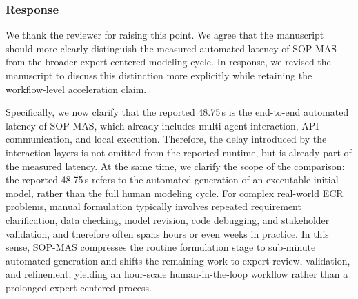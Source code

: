 \documentclass[11pt,a4paper]{article}
\begin{document}
\subsubsection{Response}
We thank the reviewer for raising this point. We agree that the manuscript should more clearly distinguish the measured automated latency of SOP-MAS from the broader expert-centered modeling cycle. In response, we revised the manuscript to discuss this distinction more explicitly while retaining the workflow-level acceleration claim.

Specifically, we now clarify that the reported 48.75\,s is the end-to-end automated latency of SOP-MAS, which already includes multi-agent interaction, API communication, and local execution. Therefore, the delay introduced by the interaction layers is not omitted from the reported runtime, but is already part of the measured latency. At the same time, we clarify the scope of the comparison: the reported 48.75\,s refers to the automated generation of an executable initial model, rather than the full human modeling cycle. For complex real-world ECR problems, manual formulation typically involves repeated requirement clarification, data checking, model revision, code debugging, and stakeholder validation, and therefore often spans hours or even weeks in practice. In this sense, SOP-MAS compresses the routine formulation stage to sub-minute automated generation and shifts the remaining work to expert review, validation, and refinement, yielding an hour-scale human-in-the-loop workflow rather than a prolonged expert-centered process.
\end{document}
